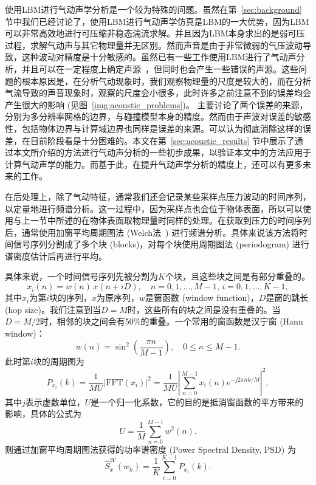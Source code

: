 使用LBM进行气动声学分析是一个较为特殊的问题。虽然在第~\ref{sec:background} 节中我们已经讨论了，使用LBM进行气动声学仿真是LBM的一大优势，因为LBM可以非常高效地进行可压缩非稳态湍流求解。并且因为LBM本身求出的是弱可压过程，求解气动声与其它物理量并无区别。然而声音是由于非常微弱的气压波动导致，这种波动对精度是十分敏感的。虽然已有一些工作使用LBM进行了气动声分析，并且可以在一定程度上确定声源~\cite{doi:10.2514/6.2013-2256, doi:10.2514/1.J052365, doi:10.2514/6.2015-2993}，但同时也会产生一些错误的声源。这些问题的根本原因是，在分析气动现象时，我们观察物理量的尺度是较大的，而在分析气流导致的声音现象时，观察的尺度会小很多，此时许多之前注意不到的误差均会产生很大的影响 (见图~\ref{img:acoustic_problems})。\citet{ASTOUL2020109645} 主要讨论了两个误差的来源，分别为多分辨率网格的边界，与碰撞模型本身的精度。然而由于声波对误差的敏感性，包括物体边界与计算域边界也同样是误差的来源。可以认为彻底消除这样的误差，在目前阶段看是十分困难的。本文在第~\ref{sec:acoustic_results} 节中展示了通过本文所介绍的方法进行气动声分析的一些初步成果，以验证本文中的方法应用于计算气动声学的能力。而基于此，在提升气动声学分析的精度上，还可以有更多未来的工作。

在后处理上，除了气动特征，通常我们还会记录某些采样点压力波动的时间序列，以定量地进行频谱分析。这一过程中，因为采样点也会位于物体表面，所以可以使用与上一节中所述的在物体表面取物理量时同样的处理。在获取到压力的时间序列后，通常使用加窗平均周期图法 (Welch法~\citep{1161901}) 进行频谱分析。具体来说该方法将时间信号序列分割成了多个块 (blocks)，对每个块使用周期图法 (periodogram) 进行谱密度估计后再进行平均。

具体来说，一个时间信号序列先被分割为$K$个块，且这些块之间是有部分重叠的。
\begin{equation}
  x_i(n) = w(n) \, x(n+i D), \quad n=0,1, \ldots, M-1, \, i=0,1, \ldots, K-1,
\end{equation}
其中$x_i$为第$i$块的序列，$x$为原序列，$w$是窗函数 (window function)，$D$是窗的跳长 (hop size)。我们注意到当$D=M$时，这些所有的块之间是没有重叠的。当$D=M/2$时，相邻的块之间会有50\%的重叠。一个常用的窗函数是汉宁窗 (Hann window)：
\begin{equation}
  w(n)=\sin^2 \left(\frac{\pi n}{M-1}\right), \quad 0 \leq n \leq M-1 .
\end{equation}
此时第$i$块的周期图为
\begin{equation}
  P_{x_i}\left(k\right)=\frac{1}{MU}\left|\mathrm{FFT}\left(x_i\right)\right|^2 = \frac{1}{MU}\left|\sum_{n=0}^{M-1} x_i(n) e^{-j 2 \pi n k / M}\right|^2,
\end{equation}
其中$j$表示虚数单位，$U$是一个归一化系数，它的目的是抵消窗函数的平方带来的影响，具体的公式为
\begin{equation}
  U=\frac{1}{M}\sum^{M-1}_{n=0} w^2(n).
\end{equation}
则通过加窗平均周期图法获得的功率谱密度 (Power Spectral Density, PSD) 为
\begin{equation}
  \hat{S}_x^W\left(w_k\right) = \frac{1}{K} \sum_{i=0}^{K-1} P_{x_i}\left(k\right).
\end{equation}